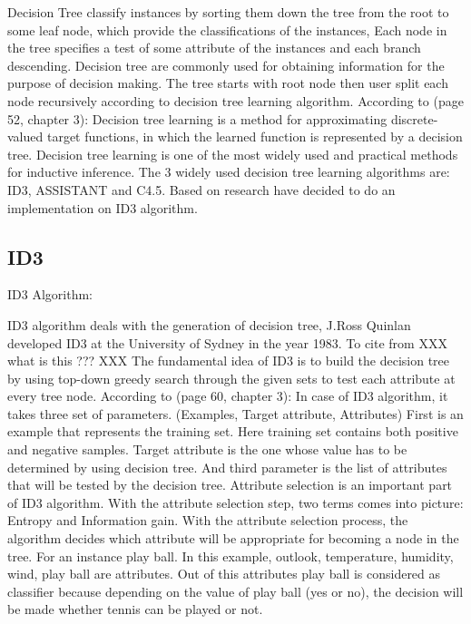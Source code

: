 \documentclass{report}
\begin{document}
Decision Tree classify instances by sorting them down the tree from the root to some leaf node, which provide the classifications of the instances, Each node in the tree specifies a test of some attribute of the instances and each branch descending.
Decision tree are commonly used for obtaining information for the purpose of decision making. The tree starts with root node then user split each node recursively according to decision tree learning algorithm.
According to \cite{Mitchell1997MachineLearning}(page 52, chapter 3): Decision tree learning is a method for approximating discrete-valued target functions, in which the learned function is represented by a decision tree. Decision tree learning is one of the most widely used and practical methods for inductive inference. The 3 widely used decision tree learning algorithms are: ID3, ASSISTANT and C4.5. Based on research have decided to do an implementation on ID3 algorithm. 


\subsection{ID3}
\label{sec:ID3}

ID3 Algorithm:

ID3 algorithm deals with the generation of decision tree, J.Ross Quinlan developed ID3 at the University of Sydney in the year 1983. To cite from \cite{OverviewOfDecisionTrees} XXX what is this ??? XXX
The fundamental idea of ID3 is to build the decision tree by using top-down greedy search through the given sets to test each attribute at every tree node.
According to \cite{Mitchell1997MachineLearning}(page 60, chapter 3): In case of ID3 algorithm, it takes three set of parameters.
(Examples, Target attribute, Attributes)
First is an example that represents the training set. Here training set contains both positive and negative samples. Target attribute is the one whose value has to be determined by using decision tree. And third parameter is the list of attributes that will be tested by the decision tree. Attribute selection is an important part of ID3 algorithm. With the attribute selection step, two terms comes into picture: Entropy and Information gain. With the attribute selection process, the algorithm decides which attribute will be appropriate for becoming a node in the tree.
For an instance play ball. In this example, outlook, temperature, humidity, wind, play ball are attributes. Out of this attributes play ball is considered as classifier because depending on the value of play ball (yes or no), the decision will be made whether tennis can be played or not.
\end{document}
